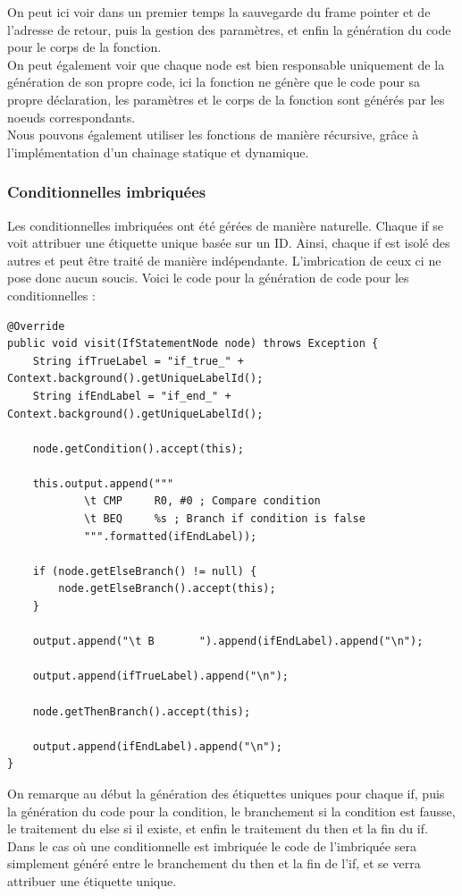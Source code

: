 \documentclass[french,a4paper]{article}
\begin{document}
    On peut ici voir dans un premier temps la sauvegarde du frame pointer et de l'adresse de retour, puis la gestion des paramètres, et enfin la génération du code pour le corps de la fonction. \\
    On peut également voir que chaque node est bien responsable uniquement de la génération de son propre code, ici la fonction ne génère que le code pour sa propre déclaration, les paramètres et le corps de la fonction sont générés par les noeuds correspondants. \\
    Nous pouvons également utiliser les fonctions de manière récursive, grâce à l'implémentation d'un chainage statique et dynamique. \\
    \subsubsection{Conditionnelles imbriquées}

    Les conditionnelles imbriquées ont été gérées de manière naturelle. Chaque if se voit attribuer une étiquette unique basée sur un ID. Ainsi, chaque if est isolé des autres et peut être traité de manière indépendante. L'imbrication de ceux ci ne pose donc aucun soucis. Voici le code pour la génération de code pour les conditionnelles :

    \begin{lstlisting}
@Override
public void visit(IfStatementNode node) throws Exception {
    String ifTrueLabel = "if_true_" + Context.background().getUniqueLabelId();
    String ifEndLabel = "if_end_" + Context.background().getUniqueLabelId();

    node.getCondition().accept(this);

    this.output.append("""
            \t CMP     R0, #0 ; Compare condition
            \t BEQ     %s ; Branch if condition is false
            """.formatted(ifEndLabel));

    if (node.getElseBranch() != null) {
        node.getElseBranch().accept(this);
    }

    output.append("\t B       ").append(ifEndLabel).append("\n");

    output.append(ifTrueLabel).append("\n");

    node.getThenBranch().accept(this);

    output.append(ifEndLabel).append("\n");
}
    \end{lstlisting}

    On remarque au début la génération des étiquettes uniques pour chaque if, puis la génération du code pour la condition, le branchement si la condition est fausse, le traitement du else si il existe, et enfin le traitement du then et la fin du if. Dans le cas où une conditionnelle est imbriquée le code de l'imbriquée sera simplement généré entre le branchement du then et la fin de l'if, et se verra attribuer une étiquette unique.
\end{document}
